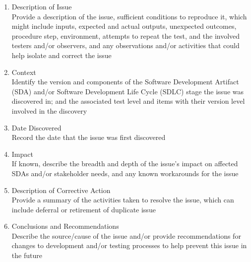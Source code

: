 \begin{enumerate}
\begin{enumerate}
        \item Description of Issue \\
        Provide a description of the issue, sufficient conditions to
        reproduce it, which might include inputs, expected and actual outputs,
        unexpected outcomes, procedure step, environment, attempts to repeat
        the test, and the involved testers and/or observers, and any
        observations and/or activities that could help isolate and correct the
        issue

        \item Context \\
        Identify the version and components of the Software Development
        Artifact (SDA) and/or Software Development Life Cycle (SDLC) stage the
        issue was discovered in; and the associated test level and items with
        their version level involved in the discovery

        \item Date Discovered \\
        Record the date that the issue was first discovered

        \item Impact \\
        If known, describe the breadth and depth of the issue's impact on
        affected SDAs and/or stakeholder needs, and any known workarounds for
        the issue

        \item Description of Corrective Action \\
        Provide a summary of the activities taken to resolve the issue, which
        can include deferral or retirement of duplicate issue

        \item Conclusions and Recommendations \\
        Describe the source/cause of the issue and/or provide recommendations
        for changes to development and/or testing processes to help prevent
        this issue in the future

    \end{enumerate}

\end{enumerate}